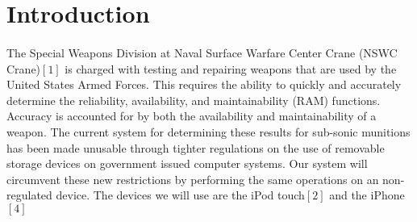 \section{Introduction}
\paragraph{} The Special Weapons Division at Naval Surface Warfare Center Crane (NSWC Crane)$[1]$ is charged with testing and repairing weapons that are used by the United States Armed Forces. This requires the ability to quickly and accurately determine the reliability, availability, and maintainability (RAM) functions. Accuracy is accounted for by both the availability and maintainability of a weapon. The current system for determining these results for sub-sonic munitions has been made unusable through tighter regulations on the use of removable storage devices on government issued computer systems. Our system will circumvent these new restrictions by performing the same operations on an non-regulated device. The devices we will use are the iPod touch$[2]$ and the iPhone$[4]$
